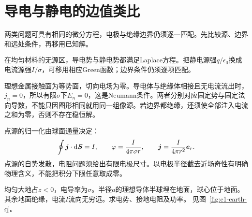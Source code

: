 \section{导电与静电的边值类比}\label{sec:c1-analogy}
两类问题可具有相同的微分方程，电极与绝缘边界仍须逐一匹配。先比较源、边界和远处条件，再移用已知解。

在均匀材料的无源区，导电势与静电势都满足Laplace方程。把静电源强$q/\epsilon_0$换成电流源强$I/\sigma$，可移用相应Green函数；边界条件仍须逐项匹配。

理想金属接触面为等势面，切向电场为零。导电体与绝缘体相接且无电流流出时，$j_n=0$，所以有限$\sigma$下$E_n=0$，这是Neumann条件。两者分别对应固定势与固定法向导数，不能只因图形相同就用同一组像源。若边界都绝缘，还须使全部注入电流之和为零，否则不存在稳恒解。

点源的归一化由球面通量决定：
\[
 \oint\bm{j}\cdot\mathop{}\!\mathrm d\bm{S}=I,\qquad
 \varphi=\frac{I}{4\pi\sigma r},\qquad
 \bm{j}=\frac{I}{4\pi r^2}\bm{e}_r.
\]
点源的自势发散，电阻问题须给出有限电极尺寸。以电极半径截去近场奇性有明确物理含义，不能把积分下限任意取成零。

\begin{example}[半球形接地电极]\label{ex:c1-earth}
均匀大地占$z<0$，电导率为$\sigma$。半径$a$的理想导体半球埋在地面，球心位于地面。其余地面绝缘，电流$I$流向无穷远。求电势、接地电阻及功率。 见图~\ref{fig:c1-earth-q}。
\end{example}

